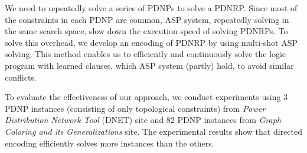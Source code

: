 \documentclass[dvipdfmx,a4paper]{jsarticle}
\begin{document}

We need to repeatedly solve a series of PDNPs to solve a PDNRP.
%
Since most of the constraints in each PDNP are common,
ASP system, repeatedly solving in the same search space,
slow down the execution speed of solving PDNRPs.
%
To solve this overhead, we develop an encoding of PDNRP
by using multi-shot ASP solving.
%
This method enables us to efficiently and continuously solve 
the logic program with learned clauses, 
which ASP system (partly) hold, to avoid similar conflicts.

%

To evaluate the effectiveness of our approach, we conduct experiments
using 3 PDNP instances (consisting of only topological constraints)
from \textit{Power Distribution Network Tool} (DNET) site and
82 PDNP instances from
\textit{Graph Coloring and its Generalizations} site.
%
The experimental results show that \textsf{directed} encoding efficiently
solves more instances than the others.

\end{document}
